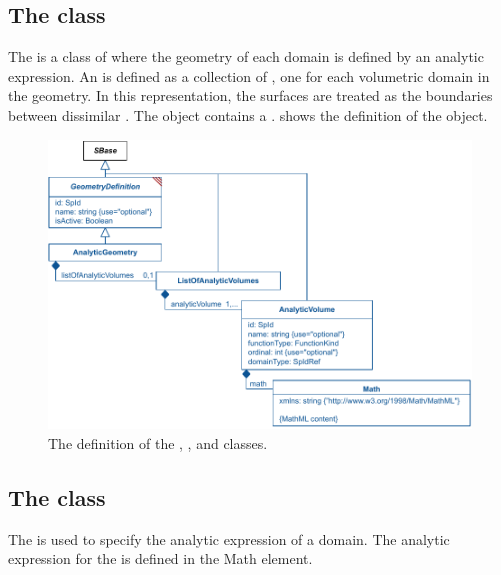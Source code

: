 \subsection{The  class}
\label{analyticgeometry-class}
\label{listofanalyticvolumes-class}
The \AnalyticGeometry is a class of \GeometryDefinition where the geometry of each domain is defined by an analytic expression. An \AnalyticGeometry is defined as a collection of \AnalyticVolumes, one \AnalyticVolume for each volumetric domain in the geometry. In this representation, the surfaces are treated as the boundaries between dissimilar \AnalyticVolumes. The \AnalyticGeometry object contains a \ListOfAnalyticVolumes.  shows the definition of the \AnalyticGeometry object.

\begin{figure}[ht]
  \includegraphics{figs/AnalyticGeometry-uml}
  \caption{The definition of the \AnalyticGeometry, \ListOfAnalyticVolumes, and \AnalyticVolume classes.}
  \label{AnalyticGeometry-uml}
  \label{ListOfAnalyticVolumes-uml}
  \label{AnalyticVolume-uml}
\end{figure}


\subsection{The  class}
\label{analyticvolume-class}
The \AnalyticVolume is used to specify the analytic expression of a domain. The analytic expression for the \AnalyticVolume is defined in the Math element.  


